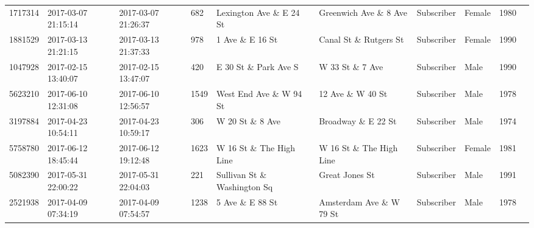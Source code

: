 \documentclass[11pt]{article}
\begin{document}
\begin{description}
\begin{tabular}{r|lllllllll}
	 1717314                       & 2017-03-07 21:15:14           & 2017-03-07 21:26:37           &  682                          & Lexington Ave \& E 24 St     & Greenwich Ave \& 8 Ave       & Subscriber                    & Female                        & 1980                         \\
	 1881529                       & 2017-03-13 21:21:15           & 2017-03-13 21:37:33           &  978                          & 1 Ave \& E 16 St             & Canal St \& Rutgers St       & Subscriber                    & Female                        & 1990                         \\
	 1047928                       & 2017-02-15 13:40:07           & 2017-02-15 13:47:07           &  420                          & E 30 St \& Park Ave S        & W 33 St \& 7 Ave             & Subscriber                    & Male                          & 1990                         \\
	 5623210                       & 2017-06-10 12:31:08           & 2017-06-10 12:56:57           & 1549                          & West End Ave \& W 94 St      & 12 Ave \& W 40 St            & Subscriber                    & Male                          & 1978                         \\
	 3197884                       & 2017-04-23 10:54:11           & 2017-04-23 10:59:17           &  306                          & W 20 St \& 8 Ave             & Broadway \& E 22 St          & Subscriber                    & Male                          & 1974                         \\
	 5758780                       & 2017-06-12 18:45:44           & 2017-06-12 19:12:48           & 1623                          & W 16 St \& The High Line     & W 16 St \& The High Line     & Subscriber                    & Female                        & 1981                         \\
	 5082390                       & 2017-05-31 22:00:22           & 2017-05-31 22:04:03           &  221                          & Sullivan St \& Washington Sq & Great Jones St                & Subscriber                    & Male                          & 1991                         \\
	 2521938                       & 2017-04-09 07:34:19           & 2017-04-09 07:54:57           & 1238                          & 5 Ave \& E 88 St             & Amsterdam Ave \& W 79 St     & Subscriber                    & Male                          & 1978                         \\

\end{tabular}
\end{description}
\end{document}
